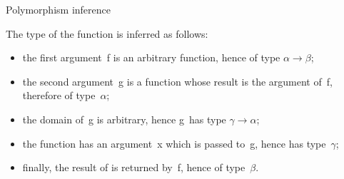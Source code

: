 %
\begin{frame}{Polymorphism inference}

  \noindent{}

  \noindent{}

  \bigskip

  The type of the function  is inferred as follows:
  \begin{itemize}

    \item the first argument~\textsf{f} is an arbitrary function,
      hence of type \(\alpha \rightarrow \beta\);

    \item the second argument~\textsf{g} is a function whose result is
      the argument of~\textsf{f}, therefore of type~\(\alpha\);

    \item the domain of~\textsf{g} is arbitrary, hence \textsf{g}~has
      type \(\gamma \rightarrow \alpha\);

    \item the function  has an argument~\textsf{x}
      which is passed to~\textsf{g}, hence has type~\(\gamma\);

    \item finally, the result of  is returned
      by~\textsf{f}, hence of type~\(\beta\).

  \end{itemize}

\end{frame}

